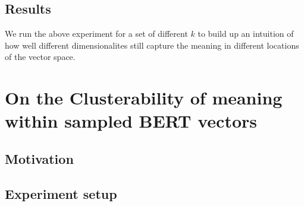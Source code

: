 \documentclass[a4paper,12pt,twoside,openright]{report}
\begin{document}


\subsection{Results}

We run the above experiment for a set of different $k$ to build up an intuition of how well different dimensionalites still capture the meaning in different locations of the vector space. 


\section{On the Clusterability of meaning within sampled BERT vectors}

\subsection{Motivation}
\subsection{Experiment setup}

\end{document}

